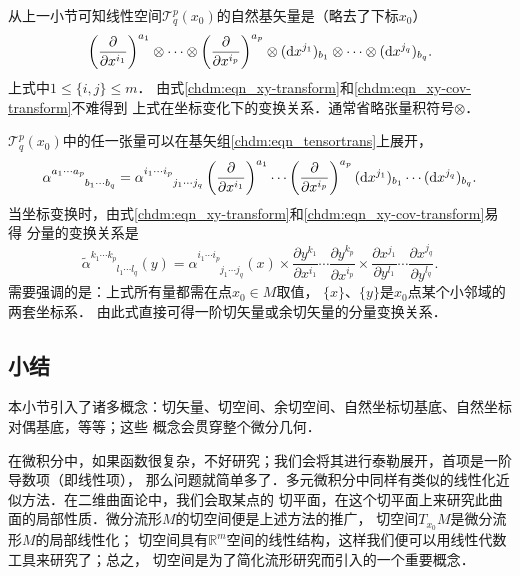 
从上一小节可知线性空间$\mathcal{T}^p_q(x_0)$的自然基矢量是（略去了下标$x_0$）
\begin{equation}\label{chdm:eqn_tensortrans}
    \left(\frac{\partial }{\partial x^{i_1}}\right)^{a_1} \otimes \cdots \otimes
    \left(\frac{\partial }{\partial x^{i_p}}\right)^{a_p} \otimes
    ({\rm d}x^{j_1})_{b_1} \otimes \cdots \otimes ({\rm d}x^{j_q})_{b_q} .
\end{equation}
上式中$1\leqslant \{i,j\} \leqslant m $．
由式\eqref{chdm:eqn_xy-transform}和\eqref{chdm:eqn_xy-cov-transform}不难得到
上式在坐标变化下的变换关系．通常省略张量积符号$\otimes$．

$\mathcal{T}^p_q(x_0)$中的任一张量可以在基矢组\eqref{chdm:eqn_tensortrans}上展开，
\begin{equation}\label{chdm:eqn_tensor-component}
    \alpha^{a_1 \cdots a_p}_{\phantom{a_1 \cdots a_p}b_1\cdots b_q} 
     = \alpha^{i_1 \cdots i_p}_{\phantom{i_1 \cdots i_p}j_1\cdots j_q} 
      \left(\frac{\partial }{\partial x^{i_1}}\right)^{a_1} \cdots 
      \left(\frac{\partial }{\partial x^{i_p}}\right)^{a_p} 
      ({\rm d}x^{j_1})_{b_1} \cdots  ({\rm d}x^{j_q})_{b_q}    .
\end{equation}
当坐标变换时，由式\eqref{chdm:eqn_xy-transform}和\eqref{chdm:eqn_xy-cov-transform}易得
分量的变换关系是
\begin{equation}\label{chdm:eqn_tensor-component-trans}
    \tilde{\alpha}^{k_1 \cdots k_p}_{\phantom{k_1 \cdots k_p}l_1\cdots l_q} (y)
    ={\alpha}^{i_1 \cdots i_p}_{\phantom{i_1 \cdots i_p}j_1\cdots j_q} (x) \times
    \frac{\partial y^{k_1}}{\partial x^{i_1}} \cdots 
    \frac{\partial y^{k_p}}{\partial x^{i_p}} \times
    \frac{\partial x^{j_1}}{\partial y^{l_1}} \cdots 
    \frac{\partial x^{j_q}}{\partial y^{l_q}} .
\end{equation}
需要强调的是：上式所有量都需在点$x_0\in M$取值，
$\{x\}$、$\{y\}$是$x_0$点某个小邻域的两套坐标系．
由此式直接可得一阶切矢量或余切矢量的分量变换关系．


\subsection*{小结}
本小节引入了诸多概念：切矢量、切空间、余切空间、自然坐标切基底、自然坐标对偶基底，等等；这些
概念会贯穿整个微分几何．

在微积分中，如果函数很复杂，不好研究；我们会将其进行泰勒展开，首项是一阶导数项（即线性项），
那么问题就简单多了．多元微积分中同样有类似的线性化近似方法．在二维曲面论中，我们会取某点的
切平面，在这个切平面上来研究此曲面的局部性质．微分流形$M$的切空间便是上述方法的推广，
切空间$T_{x_0}M$是微分流形$M$的局部线性化；
切空间具有$\mathbb{R}^m$空间的线性结构，这样我们便可以用线性代数工具来研究了；总之，
切空间是为了简化流形研究而引入的一个重要概念．

